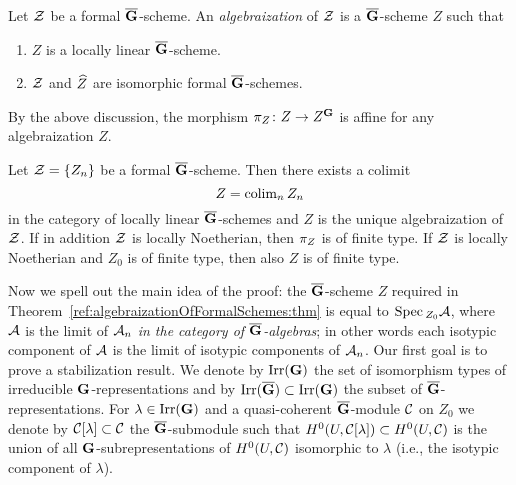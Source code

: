 \begin{definition}\label{ref:algebraization:def}
Let ${\mathcal Z}$ be a formal $\overline{\mathbf{G}}$-scheme. An \emph{algebraization} of ${\mathcal Z}$ is a $\overline{\mathbf{G}}$-scheme $Z$ such that
\begin{enumerate}
            \item\label{it:algebraization:one} $Z$ is a locally linear
                $\overline{\mathbf{G}}$-scheme.
            \item\label{it:algebraization:two} ${\mathcal Z}$ and $\widehat{Z}$ are isomorphic formal $\overline{\mathbf{G}}$-schemes.
        \end{enumerate}
    \end{definition}
    By the above discussion, the morphism
    $\pi_{Z}\colon Z\to Z^{\mathbf{G}}$ is affine for any algebraization $Z$.

    \begin{theorem}\label{ref:algebraizationOfFormalSchemes:thm}
        Let ${\mathcal Z} =\{Z_n\}$ be a formal $\overline{\mathbf{G}}$-scheme. Then there exists
        a colimit
        \[
            Z = \operatorname{colim}_{n} Z_n
        \]
        in the category of locally linear $\overline{\mathbf{G}}$-schemes and $Z$ is the
        unique algebraization of ${\mathcal Z}$.
        If in addition ${\mathcal Z}$ is locally Noetherian, then $\pi_{Z}$ is of finite type. If
        ${\mathcal Z}$ is locally Noetherian and $Z_0$ is of finite type, then also $Z$ is of
        finite type.
    \end{theorem}

Now we spell out the main idea of the proof: the $\overline{\mathbf{G}}$-scheme $Z$
required in Theorem~\ref{ref:algebraizationOfFormalSchemes:thm} is equal to $\mathrm{Spec}\,_{Z_0} {\mathcal A}$, where
${\mathcal A}$ is the limit of ${\mathcal A}_n$ \emph{in the category of
$\overline{\mathbf{G}}$-algebras}; in other words each isotypic component of ${\mathcal A}$ is the
limit of isotypic components of ${\mathcal A}_n$.
Our first goal is to prove a stabilization result.
We denote by $\operatorname{Irr}(\mathbf{G})$ the set of isomorphism types of irreducible
$\mathbf{G}$-representations and by $\operatorname{Irr}(\overline{\mathbf{G}}) \subset \operatorname{Irr}(\mathbf{G})$ the
subset of $\overline{\mathbf{G}}$-representations. For $\lambda\in \operatorname{Irr}(\mathbf{G})$ and
a quasi-coherent $\overline{\mathbf{G}}$-module ${\mathcal C}$ on $Z_0$ we denote by ${\mathcal C}[\lambda]
\subset {\mathcal C}$ the $\overline{\mathbf{G}}$-submodule such that $H^0(U, {\mathcal C}[\lambda]) \subset H^0(U, {\mathcal C})$
is the union of all $\mathbf{G}$-subrepresentations of $H^0(U, {\mathcal C})$ isomorphic to
$\lambda$ (i.e., the isotypic component of $\lambda$).


